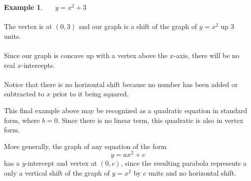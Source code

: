\documentclass[12pt]{book}
\theoremstyle{definition}
\newtheorem{example}{Example}
\begin{document}
\begin{multicols}{2}
\begin{example}~~~$y=x^2+3$\\
~\\
The vertex is at $(0,3)$ and our graph is a shift of the graph of $y=x^2$ up 3 units.\\ \\ Since our graph is concave up with a vertex above the $x$-axis, there will be no real $x$-intercepts.\\ \\  Notice that there is no horizontal shift because no number has been added or subtracted to $x$ prior to it being squared.
\columnbreak
\begin{center}
\end{center}
\end{example}
\end{multicols}

This final example above may be recognized as a quadratic equation in standard form, where $b=0$.  Since there is no linear term, this quadratic is also in vertex form.\par
More generally, the graph of any equation of the form $$y= ax^2+c$$ has a $y$-intercept and vertex at $(0,c)$, since the resulting parabola represents a only a vertical shift of the graph of $y=x^2$ by $c$ units and no horizontal shift.
\end{document}
